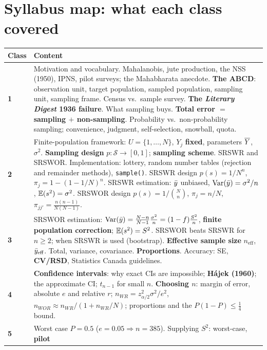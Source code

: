 \section{Syllabus map: what each class covered}

\begin{center}
\begin{longtable}{@{}p{1.4cm}p{13.4cm}@{}}
\toprule
\textbf{Class} & \textbf{Content} \\
\midrule
\endhead
\textbf{1} &
Motivation and vocabulary. Mahalanobis, jute production, the NSS (1950), IPNS, pilot surveys;
the Mahabharata anecdote. \textbf{The ABCD}: observation unit, target population, sampled
population, sampling unit, sampling frame. Census vs.\ sample survey. \textbf{The \emph{Literary
Digest} 1936 failure}. What sampling buys. \textbf{Total error $=$ sampling $+$ non-sampling}.
Probability vs.\ non-probability sampling; convenience, judgment, self-selection, snowball,
quota. \\[2pt]
\textbf{2} &
Finite-population framework: $U=\{1,\dots,N\}$, $Y_j$ \textbf{fixed}, parameters $\overline{Y}$,
$\sigma^2$. \textbf{Sampling design} $p:\mathcal S\to[0,1]$; \textbf{sampling scheme}. SRSWR and
SRSWOR. Implementation: lottery, random number tables (rejection and remainder methods),
\texttt{sample()}. SRSWR design $p(s)=1/N^n$, $\pi_j=1-(1-1/N)^n$. SRSWR estimation: $\bar{y}$
unbiased, $\operatorname{Var}(\bar{y})=\sigma^2/n$, $\mathbb{E}(s^2)=\sigma^2$. SRSWOR design $p(s)=1/\binom Nn$,
$\pi_j=n/N$, $\pi_{jj'}=\frac{n(n-1)}{N(N-1)}$. \\[2pt]
\textbf{3} &
SRSWOR estimation: $\operatorname{Var}(\bar{y})=\frac{N-n}{N-1}\frac{\sigma^2}{n}=(1-f)\frac{S^2}{n}$,
\textbf{finite population correction}; $\mathbb{E}(s^2)=S^2$. SRSWOR beats SRSWR for $n\ge2$; when SRSWR
is used (bootstrap). \textbf{Effective sample size} $n_{\text{eff}}$, $\bar{y}_{\text{eff}}$. Total,
variance, covariance. \textbf{Proportions}. Accuracy: SE, \textbf{CV/RSD}, Statistics Canada
guidelines. \\[2pt]
\textbf{4} &
\textbf{Confidence intervals}: why exact CIs are impossible; \textbf{H\'ajek (1960)}; the
approximate CI; $t_{n-1}$ for small $n$. \textbf{Choosing $n$}: margin of error, absolute $e$ and
relative $r$; $n_{WR}=z^2_{\alpha/2}\sigma^2/e^2$, $n_{WOR}\approx n_{WR}/(1+n_{WR}/N)$;
proportions and the $P(1-P)\le\frac14$ bound. \\[2pt]
\textbf{5} &
Worst case $P=0.5$ ($e=0.05\Rightarrow n=385$). Supplying $S^2$: worst-case, \textbf{pilot
}
\end{longtable}
\end{center}
